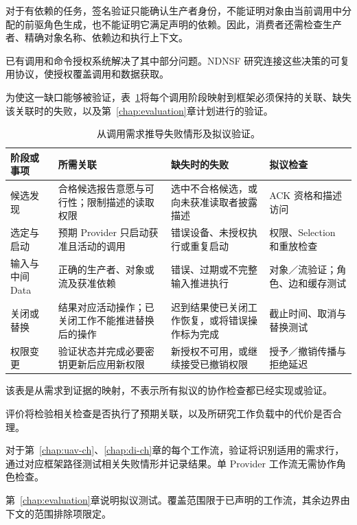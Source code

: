 对于有依赖的任务，签名验证只能确认生产者身份，不能证明对象由当前调用中分配的前驱角色生成，也不能证明它满足声明的依赖。因此，消费者还需检查生产者、精确对象名称、依赖边和执行上下文。

已有调用和命令授权系统解决了其中部分问题。NDNSF 研究连接这些决策的可复用协议，使授权覆盖调用和数据获取。

为使这一缺口能够被验证，表~\ref{tab:framework-needs-ch}将每个调用阶段映射到框架必须保持的关联、缺失该关联时的失败，以及第~\ref{chap:evaluation}章计划进行的验证。

\begin{table}[htbp]\singlespacing\centering\small
\caption{从调用需求推导失败情形及拟议验证。}
\label{tab:framework-needs-ch}
\begin{tabularx}{\textwidth}{p{}XXp{}}
\toprule 阶段或事项 & 所需关联 & 缺失时的失败 & 拟议检查\\\midrule
候选发现 & 合格候选报告意愿与可行性；限制描述的读取权限 & 选中不合格候选，或向未获准读取者披露描述 & ACK 资格和描述访问\\\midrule
选定与启动 & 预期 Provider 只启动获准且活动的调用 & 错误设备、未授权执行或重复启动 & 权限、Selection 和重放检查\\\midrule
输入与中间 Data & 正确的生产者、对象或流及获准依赖 & 错误、过期或不完整输入推进执行 & 对象／流验证；角色、边和缓存测试\\\midrule
关闭或替换 & 结果对应活动操作；已关闭工作不能推进替换后的操作 & 迟到结果使已关闭工作恢复，或将错误操作标为完成 & 截止时间、取消与替换测试\\\midrule
权限变更 & 验证状态并完成必要密钥更新后应用新权限 & 新授权不可用，或继续接受已撤销权限 & 授予／撤销传播与拒绝延迟\\\bottomrule
\end{tabularx}
\end{table}

该表是从需求到证据的映射，不表示所有拟议的协作检查都已经实现或验证。

评价将检验相关检查是否执行了预期关联，以及所研究工作负载中的代价是否合理。

对于第~\ref{chap:uav-ch}、\ref{chap:di-ch}章的每个工作流，验证将识别适用的需求行，通过对应框架路径测试相关失败情形并记录结果。单 Provider 工作流无需协作角色检查。

第~\ref{chap:evaluation}章说明拟议测试。覆盖范围限于已声明的工作流，其余边界由下文的范围排除项限定。
